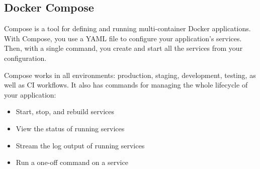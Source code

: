 \documentclass[10pt,a4paper]{report}
\begin{document}
\subsection{Docker Compose}

Compose is a tool for defining and running multi-container Docker applications. With Compose, you use a YAML file to configure your application’s services. Then, with a single command, you create and start all the services from your configuration.

Compose works in all environments: production, staging, development, testing, as well as CI workflows. It also has commands for managing the whole lifecycle of your application:
\begin{itemize}
	\item Start, stop, and rebuild services
	\item View the status of running services
	\item Stream the log output of running services
	\item Run a one-off command on a service
\end{itemize}
\end{document}
